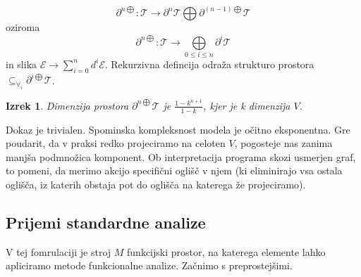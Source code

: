 \documentclass{article}
\newcommand{\E}{\mathcal{E}}
\newcommand{\T}{\mathcal{T}}
\newcommand{\Op}{\partial^{\bigoplus}}
\newcommand{\op}[1]{\partial^{#1\bigoplus}}
\newtheorem{izrek}{Izrek}[section]
\begin{document}
 \begin{equation}\label{eq:dirSumFunNRek}
	\partial^{n\bigoplus}:\T\to\partial^{n}\T\bigoplus\partial^{(n-1)\bigoplus}\T
 \end{equation}
 oziroma
 \begin{equation}\label{eq:dirSumFunN}
 	\partial^{n\bigoplus}:\T\to\bigoplus\limits_{0\leq i\leq n}\partial^{i}\T
  \end{equation}
 in slika $\E\to\sum\limits_{i=0}^nd^i\E$. Rekurzivna defincija odraža strukturo prostora $\subseteq_{\forall_i}\op{i}\T$.
 \begin{izrek}
 Dimenzija prostora $\op{n}\T$ je $\frac{1-k^{n+1}}{1-k}$, kjer je k dimenzija $V$.
 \end{izrek}
 
 Dokaz je trivialen. Spominska kompleksnost modela je očitno eksponentna. Gre poudarit, da v praksi redko projeciramo na celoten $V$, pogosteje nas zanima manjša podmnožica komponent. Ob interpretacija programa skozi usmerjen graf, to pomeni, da merimo akcijo specifični oglišč v njem (ki eliminirajo vsa ostala oglišča, iz katerih obstaja pot do oglišča na katerega že projeciramo).
 
 
 \subsection{Prijemi standardne analize}
 
 V tej fomrulaciji je stroj $M$ funkcijski prostor,  na katerega elemente lahko apliciramo metode funkcionalne analize. Začnimo s preprostejšimi.
 
\end{document}
